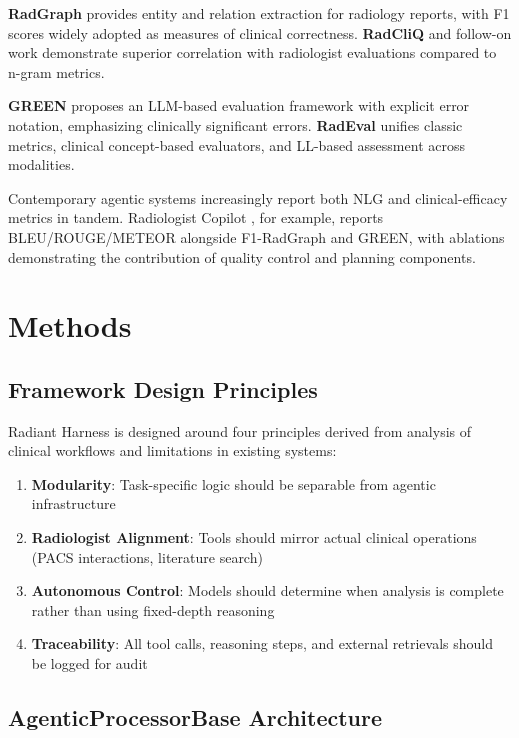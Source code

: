 \documentclass[11pt]{article}
\begin{document}
\textbf{RadGraph} \citep{radgraph2022} provides entity and relation extraction for radiology reports, with F1 scores widely adopted as measures of clinical correctness. \textbf{RadCliQ} \citep{yu2023radcliq} and follow-on work demonstrate superior correlation with radiologist evaluations compared to n-gram metrics.

\textbf{GREEN} \citep{ostmeier2024green} proposes an LLM-based evaluation framework with explicit error notation, emphasizing clinically significant errors. \textbf{RadEval} \citep{radeval2024} unifies classic metrics, clinical concept-based evaluators, and LL-based assessment across modalities.

Contemporary agentic systems increasingly report both NLG and clinical-efficacy metrics in tandem. Radiologist Copilot \citep{yucopilot2025}, for example, reports BLEU/ROUGE/METEOR alongside F1-RadGraph and GREEN, with ablations demonstrating the contribution of quality control and planning components.

\section{Methods}
\label{sec:methods}

\subsection{Framework Design Principles}

Radiant Harness is designed around four principles derived from analysis of clinical workflows and limitations in existing systems:

\begin{enumerate}
    \item \textbf{Modularity}: Task-specific logic should be separable from agentic infrastructure
    \item \textbf{Radiologist Alignment}: Tools should mirror actual clinical operations (PACS interactions, literature search)
    \item \textbf{Autonomous Control}: Models should determine when analysis is complete rather than using fixed-depth reasoning
    \item \textbf{Traceability}: All tool calls, reasoning steps, and external retrievals should be logged for audit
\end{enumerate}

\subsection{AgenticProcessorBase Architecture}
\end{document}
